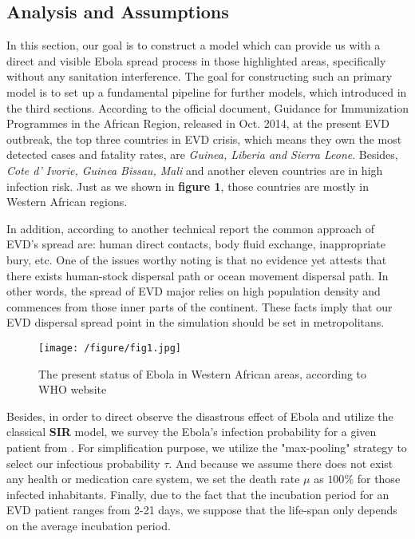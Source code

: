 \subsection{Analysis and Assumptions}
In this section, our goal is to construct a model which can provide us with a direct and visible Ebola spread process in those highlighted areas, specifically without any sanitation interference. The goal for constructing such an primary model is to set up a fundamental pipeline for further models, which introduced in the third sections. According to the official document, Guidance for Immunization Programmes in the African Region\cite{ebolaguide}, released in Oct. 2014, at the present EVD outbreak, the top three countries in EVD crisis, which means they own the most detected cases and fatality rates, are \textit{Guinea, Liberia and Sierra Leone}. Besides, \textit{Cote d' Ivorie, Guinea Bissau, Mali} and another eleven countries are in high infection risk. Just as we shown in \textbf{figure 1}, those countries are mostly in Western African regions.

In addition, according to another technical report\cite{team2014ebola} the common approach of EVD's spread are: human direct contacts, body fluid exchange, inappropriate bury, etc. One of the issues worthy noting is that no evidence yet attests that there exists human-stock dispersal path or ocean movement dispersal path. In other words, the spread of EVD major relies on high population density and commences from those inner parts of the continent. These facts imply that our EVD dispersal spread point in the simulation should be set in metropolitans. 
\begin{figure}[htbp]
\centering
\texttt{[image: /figure/fig1.jpg]}
\caption{The present status of Ebola in Western African areas, according to WHO website} \label{fig:1}
\end{figure}
Besides, in order to direct observe the disastrous effect of Ebola and utilize the classical \textbf{SIR} model, we survey the Ebola's infection probability for a given patient from \cite{world2014ebola}. For simplification purpose, we utilize the "max-pooling" strategy to select our infectious probability $\tau$. And because we assume there does not exist any health or medication care system, we set the death rate $\mu$ as $100\%$ for those infected  inhabitants. Finally, due to the fact that the incubation period for an EVD patient ranges from 2-21 days\cite{wool1998characterization}, we suppose that the life-span only depends on the average incubation period.

